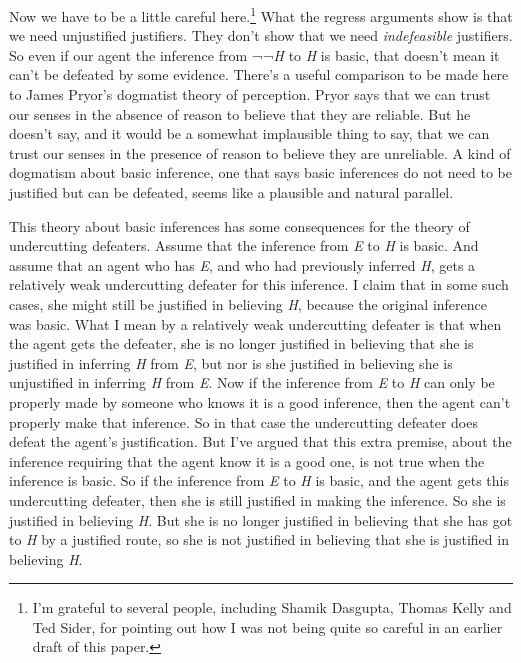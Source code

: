 \documentclass[
  11pt,
  letterpaper,
  DIV=11,
  numbers=noendperiod,
  twoside]{scrartcl}
\begin{document}
Now we have to be a little careful here.\footnote{I'm grateful to
  several people, including Shamik Dasgupta, Thomas Kelly and Ted Sider,
  for pointing out how I was not being quite so careful in an earlier
  draft of this paper.} What the regress arguments show is that we need
unjustified justifiers. They don't show that we need \emph{indefeasible}
justifiers. So even if our agent the inference from ¬¬\emph{H} to
\emph{H} is basic, that doesn't mean it can't be defeated by some
evidence. There's a useful comparison to be made here to James Pryor's
dogmatist theory of perception. Pryor says that we can trust our senses
in the absence of reason to believe that they are reliable. But he
doesn't say, and it would be a somewhat implausible thing to say, that
we can trust our senses in the presence of reason to believe they are
unreliable. A kind of dogmatism about basic inference, one that says
basic inferences do not need to be justified but can be defeated, seems
like a plausible and natural parallel.

This theory about basic inferences has some consequences for the theory
of undercutting defeaters. Assume that the inference from \emph{E} to
\emph{H} is basic. And assume that an agent who has \emph{E}, and who
had previously inferred \emph{H}, gets a relatively weak undercutting
defeater for this inference. I claim that in some such cases, she might
still be justified in believing \emph{H}, because the original inference
was basic. What I mean by a relatively weak undercutting defeater is
that when the agent gets the defeater, she is no longer justified in
believing that she is justified in inferring \emph{H} from \emph{E}, but
nor is she justified in believing she is unjustified in inferring
\emph{H} from \emph{E}. Now if the inference from \emph{E} to \emph{H}
can only be properly made by someone who knows it is a good inference,
then the agent can't properly make that inference. So in that case the
undercutting defeater does defeat the agent's justification. But I've
argued that this extra premise, about the inference requiring that the
agent know it is a good one, is not true when the inference is basic. So
if the inference from \emph{E} to \emph{H} is basic, and the agent gets
this undercutting defeater, then she is still justified in making the
inference. So she is justified in believing \emph{H}. But she is no
longer justified in believing that she has got to \emph{H} by a
justified route, so she is not justified in believing that she is
justified in believing \emph{H}.
\end{document}
